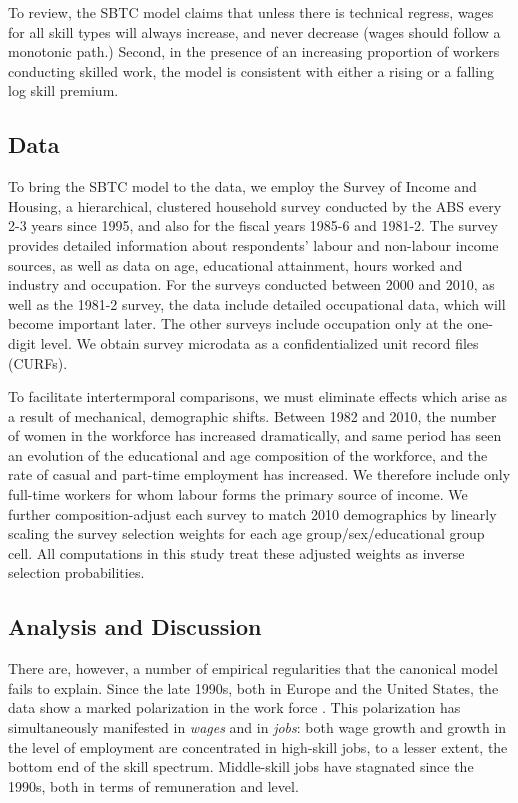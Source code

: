 \documentclass[a4paper,11pt]{article}
\begin{document}
To review, the SBTC model claims that unless there is technical regress, wages for all skill types will always increase, and never decrease (wages should follow a monotonic path.) Second, in the presence of an increasing proportion of workers conducting skilled work, the model is consistent with either a rising or a falling log skill premium.

\subsection{Data}

To bring the SBTC model to the data, we employ the Survey of Income and Housing, a hierarchical, clustered household survey conducted by the ABS every 2-3 years since 1995, and also for the fiscal years 1985-6 and 1981-2. The survey provides detailed  information about respondents' labour and non-labour income sources, as well as data on age, educational attainment, hours worked and industry and occupation. For the surveys conducted between 2000 and 2010, as well as the 1981-2 survey, the data include detailed occupational data, which will become important later. The other surveys include occupation only at the one-digit level. We obtain survey microdata as a confidentialized unit record files (CURFs).

To facilitate intertermporal comparisons, we must eliminate effects which arise as a result of mechanical, demographic shifts. Between 1982 and 2010, the number of women in the workforce has increased dramatically, and same period has seen an evolution of the educational and age composition of the workforce, and the rate of casual and part-time employment has increased. We therefore include only full-time workers for whom labour forms the primary source of income. We further composition-adjust each survey to match 2010 demographics by linearly scaling the survey selection weights for each age group/sex/educational group cell. All computations in this study treat these adjusted weights as inverse selection probabilities.

\subsection{Analysis and Discussion}

There are, however, a number of empirical regularities that the canonical model fails to explain. Since the late 1990s, both in Europe and the United States, the data show a marked polarization in the work force \citep{Goos2007, Autor2006}. This polarization has simultaneously manifested in \emph{wages} and in \emph{jobs}: both wage growth and growth in the level of employment are concentrated in high-skill jobs, to a lesser extent, the bottom end of the skill spectrum. Middle-skill jobs have stagnated since the 1990s, both in terms of remuneration and level.
\end{document}
